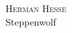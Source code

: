 \documentclass[a5paper,11pt,openany]{memoir}
\begin{document}
\thispagestyle{empty}
\begin{center}
  \vspace*{3cm}
  \textsc{Herman Hesse} \\
  {\Huge Steppenwolf}
\end{center}
  
  
  
\end{document}
